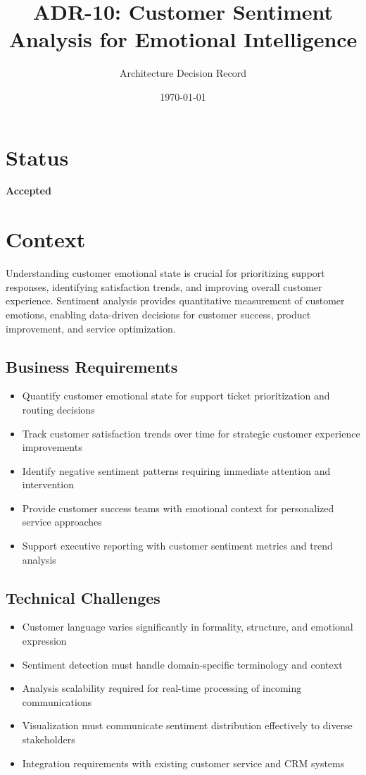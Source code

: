 \documentclass[11pt]{article}
\title{\textbf{ADR-10: Customer Sentiment Analysis for Emotional Intelligence}}
\author{Architecture Decision Record}
\date{\today}
\begin{document}
\maketitle

\section{Status}
\textbf{Accepted}

\section{Context}

Understanding customer emotional state is crucial for prioritizing support responses, identifying satisfaction trends, and improving overall customer experience. Sentiment analysis provides quantitative measurement of customer emotions, enabling data-driven decisions for customer success, product improvement, and service optimization.

\subsection{Business Requirements}
\begin{itemize}
\item Quantify customer emotional state for support ticket prioritization and routing decisions
\item Track customer satisfaction trends over time for strategic customer experience improvements
\item Identify negative sentiment patterns requiring immediate attention and intervention
\item Provide customer success teams with emotional context for personalized service approaches
\item Support executive reporting with customer sentiment metrics and trend analysis
\end{itemize}

\subsection{Technical Challenges}
\begin{itemize}
\item Customer language varies significantly in formality, structure, and emotional expression
\item Sentiment detection must handle domain-specific terminology and context
\item Analysis scalability required for real-time processing of incoming communications
\item Visualization must communicate sentiment distribution effectively to diverse stakeholders
\item Integration requirements with existing customer service and CRM systems
\end{itemize}
\end{document}
